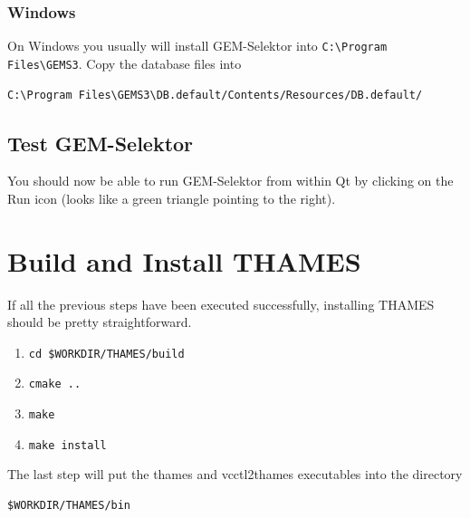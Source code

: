 \documentclass{article}
\begin{document}
\subsubsection{Windows}
On Windows you usually will install GEM-Selektor into \verb!C:\Program Files\GEMS3!.
Copy the database files into
\begin{verbatim}
C:\Program Files\GEMS3\DB.default/Contents/Resources/DB.default/
\end{verbatim}

\subsection{Test GEM-Selektor}
You should now be able to run GEM-Selektor from within Qt by clicking on the Run icon (looks
like a green triangle pointing to the right). 

\section{Build and Install THAMES}
If all the previous steps have been executed successfully, installing THAMES should be pretty
straightforward.
\begin{enumerate}
    \item \verb!cd $WORKDIR/THAMES/build!
    \item \verb!cmake ..!
    \item \verb!make!
    \item \verb!make install!
\end{enumerate}
The last step will put the thames and vcctl2thames executables into the directory
\begin{verbatim}
$WORKDIR/THAMES/bin
\end{verbatim}
\end{document}

